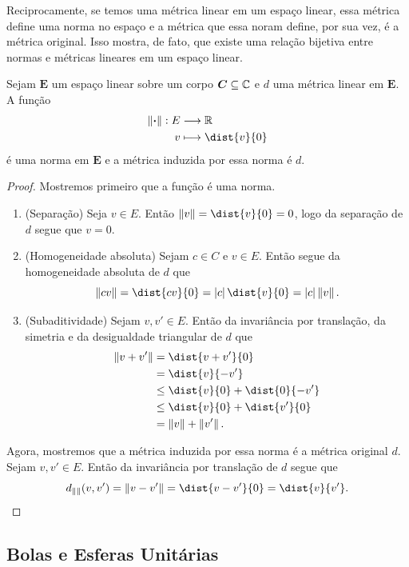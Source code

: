 Reciprocamente, se temos uma métrica linear em um espaço linear, essa métrica define uma norma no espaço e a métrica que essa noram define, por sua vez, é a métrica original. Isso mostra, de fato, que existe uma relação bijetiva entre normas e métricas lineares em um espaço linear.

\begin{prop}
Sejam $\bm E$ um espaço linear sobre um corpo $\bm C \subseteq \mathbb{C}$ e $d$ uma métrica linear em $\bm E$. A função
	\begin{align*}
	\func{\nor{\var}}{E}{\R}{v}{\dist{v}{0}}
	\end{align*}
é uma norma em $\bm E$ e a métrica induzida por essa norma é $d$.
\end{prop}
\begin{proof}
Mostremos primeiro que a função é uma norma.
	\begin{enumerate}
	\item (Separação) Seja $v \in E$. Então $\nor{v} = \dist{v}{0} = 0$, logo da separação de $d$ segue que $v=0$.
	
	\item (Homogeneidade absoluta) Sejam $c \in C$ e $v \in E$. Então segue da homogeneidade absoluta de $d$ que
		\begin{equation*}
		\nor{cv} = \dist{cv}{0} = \abs{c}\dist{v}{0} = \abs{c}\nor{v}.
		\end{equation*}
	
	\item (Subaditividade) Sejam $v,v' \in E$. Então da invariância por translação, da simetria e da desigualdade triangular de $d$ que
		\begin{align*}
		\nor{v+v'} &= \dist{v+v'}{0} \\
			&= \dist{v}{-v'} \\
			&\leq \dist{v}{0} + \dist{0}{-v'} \\
			&\leq \dist{v}{0} + \dist{v'}{0} \\
			&= \nor{v} + \nor{v'}.
		\end{align*}
	\end{enumerate}
Agora, mostremos que a métrica induzida por essa norma é a métrica original $d$. Sejam $v,v' \in E$. Então da invariância por translação de $d$ segue que
	\begin{equation*}
	d_{\nor{}}(v,v') = \nor{v-v'} = \dist{v-v'}{0} = \dist{v}{v'}. \qedhere
	\end{equation*}
\end{proof}

\subsection{Bolas e Esferas Unitárias}

